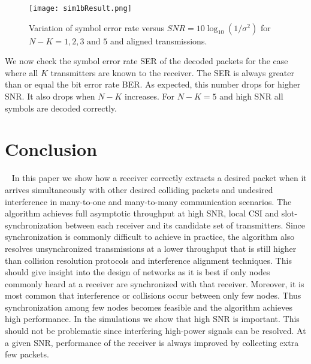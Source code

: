 \documentclass[10pt, a4paper, twocolumn]{IEEEtran}
\begin{document}
\begin{figure}[ht]
\begin{center}
\texttt{[image: sim1bResult.png]}
\caption{Variation of symbol error rate versus $SNR = 10\log_{10}(1/\sigma^2)$ for $N-K=1,2,3 \text{ and }5$ and aligned transmissions.}
\label{fig2}
\end{center}
\end{figure}

\noindent We now check the symbol error rate SER of the decoded packets for the case where all $K$ transmitters are known to the receiver. The SER is always greater than or equal the bit error rate BER. As expected, this number drops for higher SNR. It also drops when $N-K$ increases. For $N-K=5$ and high SNR all symbols are decoded correctly.

\section{Conclusion}~\label{sec9}
In this paper we show how a receiver correctly extracts a desired packet when it arrives simultaneously with other desired colliding packets and undesired interference in many-to-one and many-to-many communication scenarios. The algorithm achieves full asymptotic throughput at high SNR, local CSI and slot-synchronization between each receiver and its candidate set of transmitters. Since synchronization is commonly difficult to achieve in practice, the algorithm also resolves unsynchronized transmissions at a lower throughput that is still higher than collision resolution protocols and interference alignment techniques. This should give insight into the design of networks as it is best if only nodes commonly heard at a receiver are synchronized with that receiver. Moreover, it is most common that interference or collisions occur between only few nodes. Thus synchronization among few nodes becomes feasible and the algorithm achieves high performance. In the simulations we show that high SNR is important. This should not be problematic since interfering high-power signals can be resolved. At a given SNR, performance of the receiver is always improved by collecting extra few packets.    

\small
%
%
\end{document}

